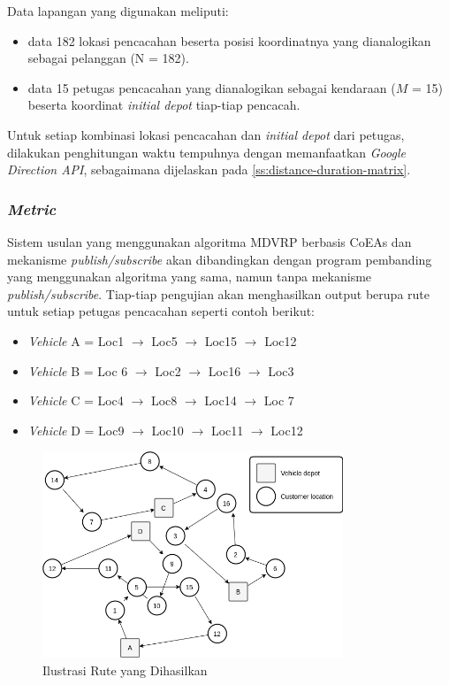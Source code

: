 Data lapangan yang digunakan meliputi:
\begin{itemize}
	\item data 182 lokasi pencacahan beserta posisi koordinatnya yang dianalogikan sebagai pelanggan (N = 182). 
	\item data 15 petugas pencacahan yang dianalogikan sebagai kendaraan ($M$ = 15) beserta koordinat \textit{initial depot} tiap-tiap pencacah.
\end{itemize}

Untuk setiap kombinasi lokasi pencacahan dan \textit{initial depot} dari petugas, dilakukan penghitungan waktu tempuhnya dengan memanfaatkan \textit{Google Direction API}, sebagaimana dijelaskan pada \autoref{ss:distance-duration-matrix}.


\subsubsection{\textit{Metric}}
\label{sssec:metric}
Sistem usulan yang menggunakan algoritma MDVRP berbasis CoEAs dan mekanisme \textit{publish/subscribe} akan dibandingkan dengan program pembanding yang menggunakan algoritma yang sama, namun tanpa mekanisme \textit{publish/subscribe}. Tiap-tiap pengujian akan menghasilkan output berupa rute untuk setiap petugas pencacahan seperti contoh berikut:

\begin{itemize}
	\item \textit{Vehicle} A = Loc1 $\rightarrow$ Loc5 $\rightarrow$ Loc15 $\rightarrow$ Loc12
	\item \textit{Vehicle} B = Loc 6 $\rightarrow$ Loc2 $\rightarrow$ Loc16 $\rightarrow$ Loc3
	\item \textit{Vehicle} C = Loc4 $\rightarrow$ Loc8 $\rightarrow$ Loc14 $\rightarrow$ Loc 7
	\item \textit{Vehicle} D = Loc9 $\rightarrow$ Loc10 $\rightarrow$ Loc11 $\rightarrow$ Loc12
\end{itemize}


\begin{figure}[!]
	\centering
	\includegraphics[width=9cm]{Resources/Images/result-mdvrp-illustration}
	\captionsetup{format=hang}
	\caption{Ilustrasi Rute yang Dihasilkan}
	\label{fig:result-mdvrp-illustration}
\end{figure}



